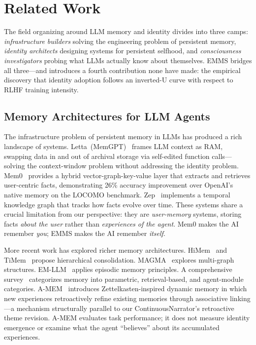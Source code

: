\documentclass[conference]{IEEEtran}
\begin{document}
\section{Related Work}

The field organizing around LLM memory and identity divides into three camps: \emph{infrastructure builders} solving the engineering problem of persistent memory, \emph{identity architects} designing systems for persistent selfhood, and \emph{consciousness investigators} probing what LLMs actually know about themselves. EMMS bridges all three---and introduces a fourth contribution none have made: the empirical discovery that identity adoption follows an inverted-U curve with respect to RLHF training intensity.

\subsection{Memory Architectures for LLM Agents}

The infrastructure problem of persistent memory in LLMs has produced a rich landscape of systems. Letta~(MemGPT)~\cite{letta2024} frames LLM context as RAM, swapping data in and out of archival storage via self-edited function calls---solving the context-window problem without addressing the identity problem. Mem0~\cite{mem0_2024} provides a hybrid vector-graph-key-value layer that extracts and retrieves user-centric facts, demonstrating 26\% accuracy improvement over OpenAI's native memory on the LOCOMO benchmark. Zep~\cite{zep2024} implements a temporal knowledge graph that tracks how facts evolve over time. These systems share a crucial limitation from our perspective: they are \emph{user-memory} systems, storing facts \emph{about the user} rather than \emph{experiences of the agent}. Mem0 makes the AI remember \emph{you}; EMMS makes the AI remember \emph{itself}.

More recent work has explored richer memory architectures. HiMem~\cite{himem2025} and TiMem~\cite{timem2025} propose hierarchical consolidation. MAGMA~\cite{magma2025} explores multi-graph structures. EM-LLM~\cite{emlllm2025} applies episodic memory principles. A comprehensive survey~\cite{memorySurvey2024} categorizes memory into parametric, retrieval-based, and agent-module categories. A-MEM~\cite{amem2025} introduces Zettelkasten-inspired dynamic memory in which new experiences retroactively refine existing memories through associative linking---a mechanism structurally parallel to our ContinuousNarrator's retroactive theme revision. A-MEM evaluates task performance; it does not measure identity emergence or examine what the agent ``believes'' about its accumulated experiences.
\end{document}
